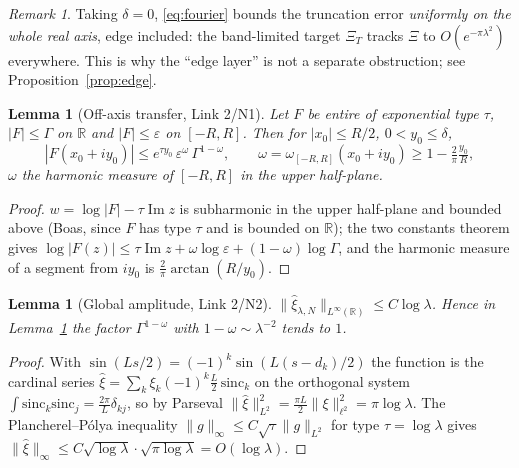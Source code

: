 \documentclass[11pt]{amsart}
\newtheorem{lemma}[theorem]{Lemma}
\theoremstyle{definition}
\theoremstyle{remark}
\newtheorem{remark}[theorem]{Remark}
\newcommand{\bbR}{\mathbb{R}}
\newcommand{\xih}{\widehat{\xi}}
\DeclareMathOperator{\Imag}{Im}
\begin{document}
\begin{remark}
Taking $\delta=0$, \eqref{eq:fourier} bounds the truncation error
\emph{uniformly on the whole real axis}, edge included: the band-limited
target $\Xi_T$ tracks $\Xi$ to $O(e^{-\pi\lambda^2})$ everywhere. This is why
the ``edge layer'' is not a separate obstruction; see
Proposition~\ref{prop:edge}.
\end{remark}

\begin{lemma}[Off-axis transfer, Link 2/N1]\label{lem:transfer}
Let $F$ be entire of exponential type $\tau$, $|F|\leq\Gamma$ on $\bbR$ and
$|F|\leq\varepsilon$ on $[-R,R]$. Then for $|x_0|\leq R/2$, $0<y_0\leq\delta$,
\[
|F(x_0+iy_0)|\leq e^{\tau y_0}\,\varepsilon^{\omega}\,\Gamma^{1-\omega},
\qquad \omega=\omega_{[-R,R]}(x_0+iy_0)\geq1-\tfrac{2}{\pi}\tfrac{y_0}{R},
\]
$\omega$ the harmonic measure of $[-R,R]$ in the upper half-plane.
\end{lemma}
\begin{proof}
$w=\log|F|-\tau\Imag z$ is subharmonic in the upper half-plane and bounded
above (Boas, since $F$ has type $\tau$ and is bounded on $\bbR$); the two
constants theorem gives
$\log|F(z)|\leq\tau\Imag z+\omega\log\varepsilon+(1-\omega)\log\Gamma$, and the
harmonic measure of a segment from $iy_0$ is
$\tfrac2\pi\arctan(R/y_0)$.
\end{proof}

\begin{lemma}[Global amplitude, Link 2/N2]\label{lem:amplitude}
$\|\xih_{\lambda,N}\|_{L^\infty(\bbR)}\leq C\log\lambda$. Hence in
Lemma~\ref{lem:transfer} the factor $\Gamma^{1-\omega}$ with $1-\omega\sim
\lambda^{-2}$ tends to $1$.
\end{lemma}
\begin{proof}
With $\sin(Ls/2)=(-1)^k\sin(L(s-d_k)/2)$ the function is the cardinal series
$\xih=\sum_k\xi_k(-1)^k\tfrac L2\,\mathrm{sinc}_k$ on the orthogonal system
$\int\mathrm{sinc}_k\mathrm{sinc}_j=\tfrac{2\pi}{L}\delta_{kj}$, so by Parseval
$\|\xih\|_{L^2}^2=\tfrac{\pi L}{2}\|\xi\|_{\ell^2}^2=\pi\log\lambda$. The
Plancherel--Pólya inequality $\|g\|_\infty\leq C\sqrt{\tau}\|g\|_{L^2}$ for
type $\tau=\log\lambda$ gives $\|\xih\|_\infty\leq C\sqrt{\log\lambda}\cdot
\sqrt{\pi\log\lambda}=O(\log\lambda)$.
\end{proof}
\end{document}
